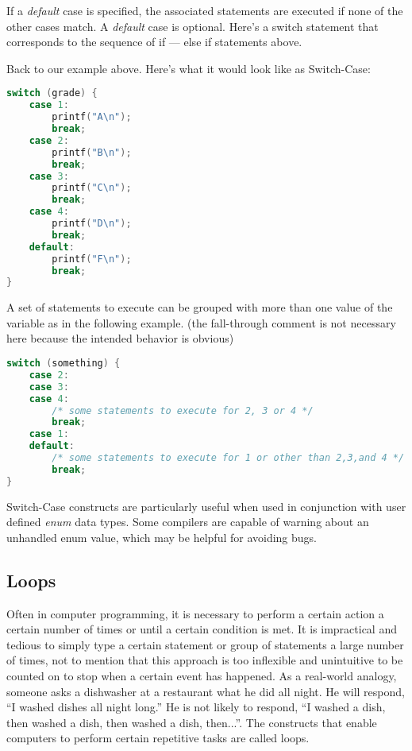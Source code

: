 If a \emph{default} case is specified, the associated statements are executed
if none of the other cases match. A \emph{default} case is optional. Here's a
switch statement that corresponds to the sequence of if --- else if statements
above.

Back to our example above. Here's what it would look like as Switch-Case:
\lstset{basicstyle=\scriptsize, numbers=left, captionpos=b, tabsize=4}
\begin{lstlisting}[caption=Section \thesection listing \arabic{controlcnt},language={C},
breaklines=true,xleftmargin=15pt, label=lst:section\thesection listing\arabic{controlcnt}]
switch (grade) {
	case 1:
		printf("A\n");
		break;
	case 2:
		printf("B\n");
		break;
	case 3:
		printf("C\n");
		break;
	case 4:
		printf("D\n");
		break;
	default:
		printf("F\n");
		break;
}
\end{lstlisting}

A set of statements to execute can be grouped with more than one value of the
variable as in the following example. (the fall-through comment is not
necessary here because the intended behavior is obvious)

\lstset{basicstyle=\scriptsize, numbers=left, captionpos=b, tabsize=4}
\begin{lstlisting}[caption=Section \thesection listing \arabic{controlcnt},language={C},
breaklines=true,xleftmargin=15pt, label=lst:section\thesection listing\arabic{controlcnt}]
switch (something) {
	case 2:
	case 3:
	case 4:
		/* some statements to execute for 2, 3 or 4 */
		break;
	case 1:
	default:
		/* some statements to execute for 1 or other than 2,3,and 4 */
		break;
}
\end{lstlisting}

Switch-Case constructs are particularly useful when used in conjunction with
user defined \emph{enum} data types. Some compilers are capable of warning
about an unhandled enum value, which may be helpful for avoiding bugs.

\subsection{Loops}
Often in computer programming, it is necessary to perform a certain action a
certain number of times or until a certain condition is met. It is impractical
and tedious to simply type a certain statement or group of statements a large
number of times, not to mention that this approach is too inflexible and
unintuitive to be counted on to stop when a certain event has happened. As a
real-world analogy, someone asks a dishwasher at a restaurant what he did all
night. He will respond, ``I washed dishes all night long.'' He is not likely to
respond, ``I washed a dish, then washed a dish, then washed a dish, then...''.
The constructs that enable computers to perform certain repetitive tasks are
called loops.

